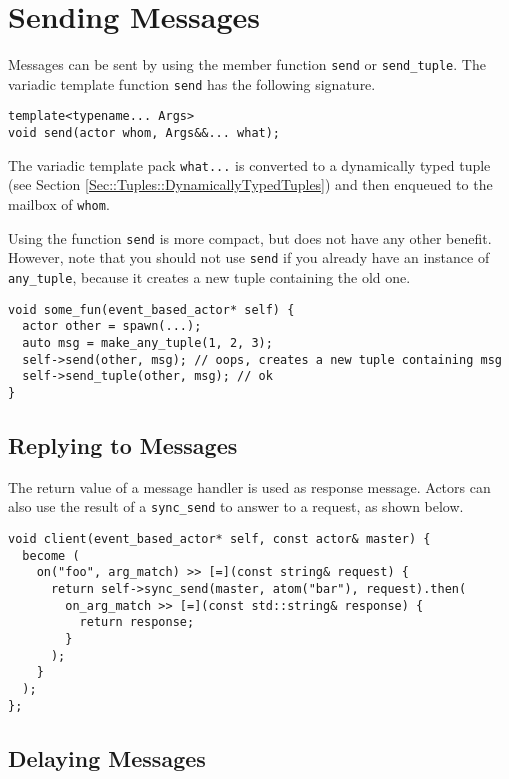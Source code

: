 \section{Sending Messages}
\label{Sec::Send}

Messages can be sent by using the member function \lstinline^send^ or \lstinline^send_tuple^.
The variadic template function \lstinline^send^ has the following signature.

\begin{lstlisting}
template<typename... Args>
void send(actor whom, Args&&... what);
\end{lstlisting}

The variadic template pack \lstinline^what...^ is converted to a dynamically typed tuple (see Section \ref{Sec::Tuples::DynamicallyTypedTuples}) and then enqueued to the mailbox of \lstinline^whom^.

Using the function \lstinline^send^ is more compact, but does not have any other benefit.
However, note that you should not use \lstinline^send^ if you already have an instance of \lstinline^any_tuple^, because it creates a new tuple containing the old one.

\begin{lstlisting}
void some_fun(event_based_actor* self) {
  actor other = spawn(...);
  auto msg = make_any_tuple(1, 2, 3);
  self->send(other, msg); // oops, creates a new tuple containing msg
  self->send_tuple(other, msg); // ok
}
\end{lstlisting}

\clearpage
\subsection{Replying to Messages}
\label{Sec::Send::Reply}

The return value of a message handler is used as response message.
Actors can also use the result of a \lstinline^sync_send^ to answer to a request, as shown below.

\begin{lstlisting}
void client(event_based_actor* self, const actor& master) {
  become (
    on("foo", arg_match) >> [=](const string& request) {
      return self->sync_send(master, atom("bar"), request).then(
        on_arg_match >> [=](const std::string& response) {
          return response;
        }
      );
    }
  );
};
\end{lstlisting}

\subsection{Delaying Messages}

